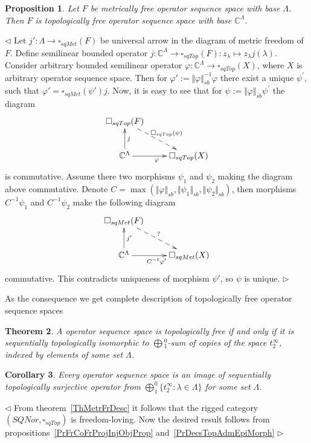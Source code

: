 \documentclass[12pt]{article}
\newtheorem{theorem}{Theorem}[subsection]
\newtheorem{proposition}[theorem]{Proposition}
\newtheorem{corollary}[theorem]{Corollary}
\newenvironment{proof}{\par $\triangleleft$}{$\triangleright$}
\begin{document}
\begin{proposition}\label{PrMetrFrIsTopFr} Let $F$ be metrically free 
operator sequence space with base $\Lambda$. Then $F$ is topologically 
free operator sequence space with base $\mathbb{C}^{\Lambda}$.
\end{proposition}
\begin{proof} Let $j':\Lambda\to \square_{sqMet}(F)$ be universal arrow in the 
diagram of metric freedom of $F$. Define semilinear bounded 
operator 
$j:\mathbb{C}^{\Lambda}\to\square_{sqTop}(F)
:z_\lambda\mapsto z_\lambda j(\lambda)$. Consider arbitrary bounded semilinear 
operator $\varphi : \mathbb{C}^{\Lambda} \to \square_{sqTop}(X)$, where 
$X$ is arbitrary operator sequence space. Then 
for $\varphi':=\Vert \varphi \Vert_{sb}^{-1}\varphi $ there exist 
a unique $\psi^{'}$, such that $\varphi'=\square_{sqMet}(\psi')j$. Now, it is 
easy to see that for $\psi:=\Vert \varphi \Vert_{sb} \psi^{'}$ the diagram
$$
\xymatrix{{\square_{sqTop}(F)}
\ar@{-->}[dr]^{\square_{sqTop}(\psi)} & \\  %
{\mathbb{C}^{\Lambda}}
\ar[u]_{j}\ar[r]_{\varphi}  &{\square_{sqTop}(X)} }  %
$$
is commutative. Assume there two morphisms $\psi_1$ and $\psi_2$ making the 
diagram above commutative. 
Denote $C=\max(
    \Vert\varphi\Vert_{sb},
    \Vert\psi_1 \Vert_{sb}, 
    \Vert\psi_2\Vert_{sb}
)$, 
then morphisms $C^{-1}\psi_1$ and $C^{-1}\psi_2$ make the following diagram
$$
\xymatrix{{\square_{sqMet}(F)}
\ar@{-->}[dr]^{?} & \\  %
{\mathbb{C}^\Lambda}
\ar[u]_{j'}\ar[r]_{ C^{-1}\varphi'}  &{\square_{sqMet}(X)} }  %
$$
commutative. This contradicts uniqueness of morphism $\psi'$, 
so $\psi$ is unique.
\end{proof}

As the consequence we get complete description of topologically 
free operator sequence spaces

\begin{theorem}\label{ThTopFrDesc} 
A operator sequence space is topologically free if and only if it is 
sequentially topologically isomorphic to $\bigoplus{}_1^0$-sum of copies of 
the space $t_2^\infty$, indexed by elements of some set $\Lambda$.
\end{theorem}

\begin{corollary}\label{CorSQSpaceIsImgTopAdmEpiMorph}
Every operator sequence space is an image of sequentially topologically 
surjective operator from $\bigoplus_1^0 \{t_2^\infty:\lambda\in\Lambda \}$ 
for some set $\Lambda$.
\end{corollary}
\begin{proof}
From theorem~\ref{ThMetrFrDesc} it follows that the rigged 
category $(SQNor,\square_{sqTop})$ is freedom-loving. Now the desired result 
follows from propositions~\ref{PrFrCoFrProjInjObjProp} 
and~\ref{PrDecsTopAdmEpiMorph}
\end{proof}
\end{document}
